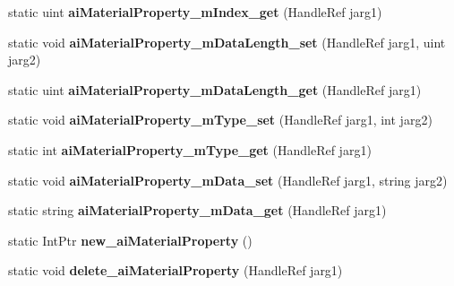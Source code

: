 \begin{DoxyCompactItemize}
\item 
\hypertarget{class_assimp_p_i_n_v_o_k_e_ab76d665ebfc7d33ba6187c3a3ca044f2}{static uint {\bfseries ai\+Material\+Property\+\_\+m\+Index\+\_\+get} (Handle\+Ref jarg1)}\label{class_assimp_p_i_n_v_o_k_e_ab76d665ebfc7d33ba6187c3a3ca044f2}

\item 
\hypertarget{class_assimp_p_i_n_v_o_k_e_a6ed2dad3f49f82919278981e6bd4fe50}{static void {\bfseries ai\+Material\+Property\+\_\+m\+Data\+Length\+\_\+set} (Handle\+Ref jarg1, uint jarg2)}\label{class_assimp_p_i_n_v_o_k_e_a6ed2dad3f49f82919278981e6bd4fe50}

\item 
\hypertarget{class_assimp_p_i_n_v_o_k_e_a51e5120fd717ce1d67fac70b79eb8a4c}{static uint {\bfseries ai\+Material\+Property\+\_\+m\+Data\+Length\+\_\+get} (Handle\+Ref jarg1)}\label{class_assimp_p_i_n_v_o_k_e_a51e5120fd717ce1d67fac70b79eb8a4c}

\item 
\hypertarget{class_assimp_p_i_n_v_o_k_e_ab2499576e21771db7e5f2f3e967211e0}{static void {\bfseries ai\+Material\+Property\+\_\+m\+Type\+\_\+set} (Handle\+Ref jarg1, int jarg2)}\label{class_assimp_p_i_n_v_o_k_e_ab2499576e21771db7e5f2f3e967211e0}

\item 
\hypertarget{class_assimp_p_i_n_v_o_k_e_a95870cf253bd75d700cae8d9bf1ba3af}{static int {\bfseries ai\+Material\+Property\+\_\+m\+Type\+\_\+get} (Handle\+Ref jarg1)}\label{class_assimp_p_i_n_v_o_k_e_a95870cf253bd75d700cae8d9bf1ba3af}

\item 
\hypertarget{class_assimp_p_i_n_v_o_k_e_a42bcd590929db0d60e68cf8329343a3d}{static void {\bfseries ai\+Material\+Property\+\_\+m\+Data\+\_\+set} (Handle\+Ref jarg1, string jarg2)}\label{class_assimp_p_i_n_v_o_k_e_a42bcd590929db0d60e68cf8329343a3d}

\item 
\hypertarget{class_assimp_p_i_n_v_o_k_e_a976d53fad59ac79c33ce757b5e7e09d4}{static string {\bfseries ai\+Material\+Property\+\_\+m\+Data\+\_\+get} (Handle\+Ref jarg1)}\label{class_assimp_p_i_n_v_o_k_e_a976d53fad59ac79c33ce757b5e7e09d4}

\item 
\hypertarget{class_assimp_p_i_n_v_o_k_e_af61ba80c82b5ad8397e0f4ebac17386c}{static Int\+Ptr {\bfseries new\+\_\+ai\+Material\+Property} ()}\label{class_assimp_p_i_n_v_o_k_e_af61ba80c82b5ad8397e0f4ebac17386c}

\item 
\hypertarget{class_assimp_p_i_n_v_o_k_e_a7bd6f0eec3af42f0b960f2791b4c903e}{static void {\bfseries delete\+\_\+ai\+Material\+Property} (Handle\+Ref jarg1)}\label{class_assimp_p_i_n_v_o_k_e_a7bd6f0eec3af42f0b960f2791b4c903e}


\end{DoxyCompactItemize}
